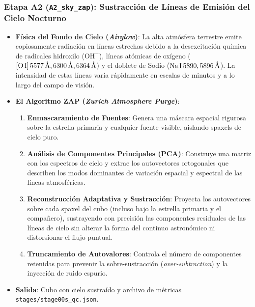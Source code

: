 \documentclass[11pt,a4paper]{article}
\begin{document}
\subsubsection{Etapa A2 (\texttt{A2\_sky\_zap}): Sustracción de Líneas de Emisión del Cielo Nocturno}
\begin{itemize}[leftmargin=1.0cm]
    \item \textbf{Física del Fondo de Cielo (\textit{Airglow})}: La alta atmósfera terrestre emite copiosamente radiación en líneas estrechas debido a la desexcitación química de radicales hidroxilo ($\text{OH}^-$), líneas atómicas de oxígeno ($[\text{O\,I}]\,5577\,\text{\AA}, 6300\,\text{\AA}, 6364\,\text{\AA}$) y el doblete de Sodio ($\text{Na\,I}\,5890, 5896\,\text{\AA}$). La intensidad de estas líneas varía rápidamente en escalas de minutos y a lo largo del campo de visión.
    \item \textbf{El Algoritmo ZAP (\textit{Zurich Atmosphere Purge})}:
    \begin{enumerate}
        \item \textbf{Enmascaramiento de Fuentes}: Genera una máscara espacial rigurosa sobre la estrella primaria y cualquier fuente visible, aislando spaxels de cielo puro.
        \item \textbf{Análisis de Componentes Principales (PCA)}: Construye una matriz con los espectros de cielo y extrae los autovectores ortogonales que describen los modos dominantes de variación espacial y espectral de las líneas atmosféricas.
        \item \textbf{Reconstrucción Adaptativa y Sustracción}: Proyecta los autovectores sobre cada spaxel del cubo (incluso bajo la estrella primaria y el compañero), sustrayendo con precisión las componentes residuales de las líneas de cielo sin alterar la forma del continuo astronómico ni distorsionar el flujo puntual.
        \item \textbf{Truncamiento de Autovalores}: Controla el número de componentes retenidas para prevenir la sobre-sustracción (\textit{over-subtraction}) y la inyección de ruido espurio.
    \end{enumerate}
    \item \textbf{Salida}: Cubo con cielo sustraído y archivo de métricas \texttt{stages/stage00s\_qc.json}.
\end{itemize}
\end{document}
